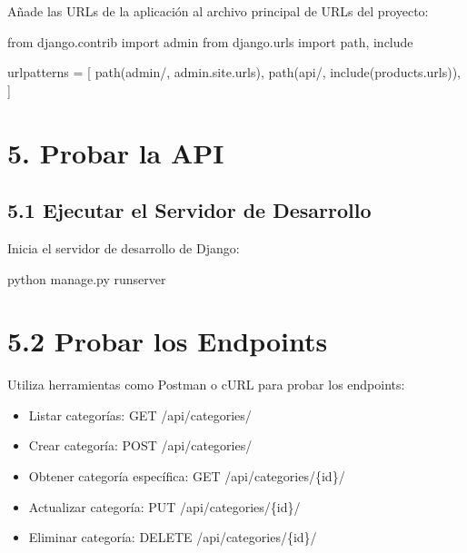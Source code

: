 \documentclass[
  a4paper,
  DIV=11,
  numbers=noendperiod,
  onepage,
  openany]{scrreprt}
\newenvironment{Shaded}{\begin{snugshade}}{\end{snugshade}}
\newcommand{\ExtensionTok}[1]{\textcolor[rgb]{0.00,0.23,0.31}{#1}}
\newcommand{\ImportTok}[1]{\textcolor[rgb]{0.00,0.46,0.62}{#1}}
\newcommand{\NormalTok}[1]{\textcolor[rgb]{0.00,0.23,0.31}{#1}}
\newcommand{\OperatorTok}[1]{\textcolor[rgb]{0.37,0.37,0.37}{#1}}
\newcommand{\StringTok}[1]{\textcolor[rgb]{0.13,0.47,0.30}{#1}}
\providecommand{\tightlist}{%
  \setlength{\itemsep}{0pt}\setlength{\parskip}{0pt}}\usepackage{longtable,booktabs,array}
\begin{document}
Añade las URLs de la aplicación al archivo principal de URLs del
proyecto:

\begin{Shaded}
\begin{Highlighting}[]
\ImportTok{from}\NormalTok{ django.contrib }\ImportTok{import}\NormalTok{ admin}
\ImportTok{from}\NormalTok{ django.urls }\ImportTok{import}\NormalTok{ path, include}

\NormalTok{urlpatterns }\OperatorTok{=}\NormalTok{ [}
\NormalTok{    path(}\StringTok{\textquotesingle{}admin/\textquotesingle{}}\NormalTok{, admin.site.urls),}
\NormalTok{    path(}\StringTok{\textquotesingle{}api/\textquotesingle{}}\NormalTok{, include(}\StringTok{\textquotesingle{}products.urls\textquotesingle{}}\NormalTok{)),}
\NormalTok{]}
\end{Highlighting}
\end{Shaded}

\section{5. Probar la API}\label{probar-la-api}

\subsection{5.1 Ejecutar el Servidor de
Desarrollo}\label{ejecutar-el-servidor-de-desarrollo}

Inicia el servidor de desarrollo de Django:

\begin{Shaded}
\begin{Highlighting}[]
\ExtensionTok{python}\NormalTok{ manage.py runserver}
\end{Highlighting}
\end{Shaded}

\section{5.2 Probar los Endpoints}\label{probar-los-endpoints}

Utiliza herramientas como Postman o cURL para probar los endpoints:

\begin{itemize}
\tightlist
\item
  Listar categorías: GET /api/categories/
\item
  Crear categoría: POST /api/categories/
\item
  Obtener categoría específica: GET /api/categories/\{id\}/
\item
  Actualizar categoría: PUT /api/categories/\{id\}/
\item
  Eliminar categoría: DELETE /api/categories/\{id\}/
\end{itemize}
\end{document}
